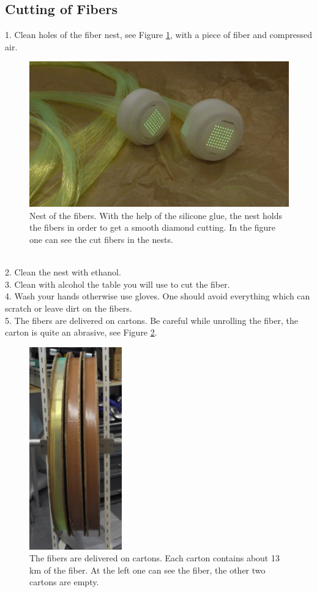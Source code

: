 \documentclass[a4paper]{article}\linespread{1.4}
\begin{document}
\subsection{Cutting of Fibers }
1.	Clean holes of the fiber nest, see Figure \ref{fig:nestf}, with a piece of fiber and compressed air.
\begin{figure}[h!] \hspace*{-0.5cm} \includegraphics[width=135mm,scale=2.0]{nestfpaint.jpg} \caption{Nest of the fibers. With the help of the silicone glue, the nest holds the fibers in order to get a smooth diamond cutting. In the figure one can see the cut fibers in the nests.}  \label{fig:nestf}\end{figure}
\\2.	Clean the nest with ethanol.
\\3.	Clean  with alcohol the table you will use to cut the fiber.
\\4.	Wash your hands otherwise use gloves. One should avoid everything which can scratch or leave dirt on the fibers.
\\5.	The fibers are delivered on cartons. Be careful while unrolling the fiber, the carton is quite an abrasive, see Figure \ref{fig:carton}.
\begin{figure}[h!] \centering \includegraphics[width=40mm,scale=2.0]{cartonpaint.png} \caption{The fibers are delivered on cartons. Each carton contains about 13 km of the fiber. At the left one can see the fiber, the other two cartons are empty.}  \label{fig:carton}\end{figure}
\end{document}
